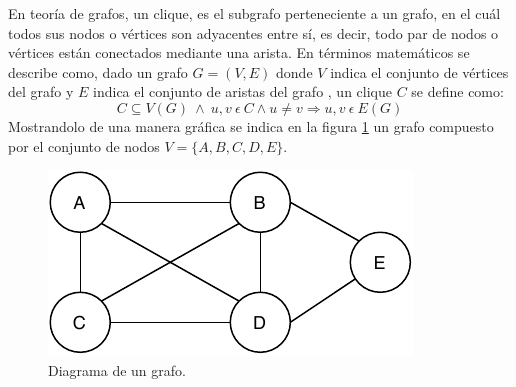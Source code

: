 En teoría de grafos, un clique, es el subgrafo perteneciente a un grafo, en el cuál todos sus nodos o vértices son adyacentes entre sí, es decir, todo par de nodos o vértices están conectados mediante una arista. En términos matemáticos se describe como, dado un grafo $G = (V, E)$ donde $V$ indica el conjunto de vértices del grafo y $E$ indica el conjunto de aristas del grafo \cite{web-clique}, un clique $C$ se define como:
\[
C \subseteq V(G) ~ \wedge ~ u, v ~ \epsilon ~ C  \wedge  u  \neq v \Rightarrow u, v ~ \epsilon ~ E(G)
\]
Mostrandolo de una manera gráfica se indica en la figura  \ref{fig:graph} un grafo compuesto por el conjunto de nodos $V=\{A, B, C, D, E\}$.

\begin{figure}[H]
	\centering
	\includegraphics{Figures/graph.pdf}
	\caption{Diagrama de un grafo.}
	\label{fig:graph}
\end{figure}

